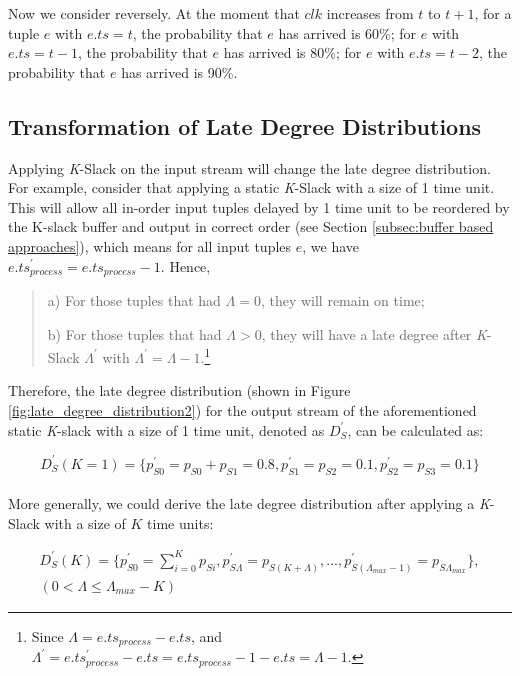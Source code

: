 \documentclass[a4paper, 11pt, twoside]{report}
\begin{document}
Now we consider reversely. At the moment that $clk$ increases from $t$ to $t+1$, for a tuple $e$ with $e.ts=t$, the probability that $e$ has arrived is 60\%; for $e$ with $e.ts=t-1$, the probability that $e$ has arrived is 80\%; for $e$ with $e.ts=t-2$, the probability that $e$ has arrived is 90\%.\\

\subsection{Transformation of Late Degree Distributions}

Applying \textit{K}-Slack on the input stream will change the late degree distribution. For example, consider that applying a static \textit{K}-Slack with a size of 1 time unit. This will allow all in-order input tuples delayed by 1 time unit to be reordered by the K-slack buffer and output in correct order (see Section \ref{subsec:buffer based approaches}), which means for all input tuples $e$, we have $e.ts^{\prime}_{process}=e.ts_{process}-1$. Hence,

\begin{quote}
	a) For those tuples that had $\Lambda = 0$, they will remain on time;

	b) For those tuples that had $\Lambda > 0$, they will have a late degree after \textit{K}-Slack $\Lambda^{\prime}$ with $\Lambda^{\prime}=\Lambda-1$.\footnote{Since $\Lambda=e.ts_{process}-e.ts$, and $\Lambda^{\prime}=e.ts^{\prime}_{process}-e.ts=e.ts_{process}-1-e.ts=\Lambda-1$.}
\end{quote}

Therefore, the late degree distribution (shown in Figure \ref{fig:late_degree_distribution2}) for the output stream of the aforementioned static \textit{K}-slack with a size of 1 time unit, denoted as $D_S^{\prime}$, can be calculated as:

$$D_S^{\prime}(K=1)=\{p^{\prime}_{S0}=p_{S0}+p_{S1}=0.8, p^{\prime}_{S1}=p_{S2}=0.1, p^{\prime}_{S2}=p_{S3}=0.1\}$$\\

More generally, we could derive the late degree distribution after applying a \textit{K}-Slack with a size of $K$ time units:

\begin{equation}
\begin{split}
D_S^{\prime}(K)=\{p^{\prime}_{S0}= \sum\limits_{i=0}^{K} p_{Si}, p^{\prime}_{S\Lambda}=p_{S(K+\Lambda)}, ..., p^{\prime}_{S(\Lambda_{max}-1)} = p_{S\Lambda_{max}}\},	\\
(0 < \Lambda \leq \Lambda_{max}-K)
\end{split}
\end{equation}
\end{document}
